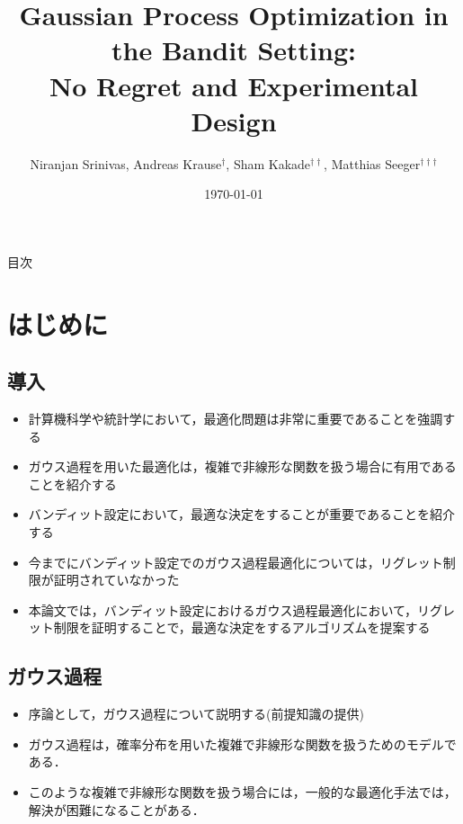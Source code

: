 \documentclass[dvipdfmx, 10.5pt]{beamer}
\title[]{Gaussian Process Optimization in the Bandit Setting:\\No Regret and Experimental Design}
\subtitle{}
\author[]{Niranjan Srinivas, Andreas Krause$^{\dag}$, Sham Kakade$^{\dag\dag}$, Matthias Seeger$^{\dag\dag\dag}$}
\date[\today]{\today}
\institute[]{$\dag$: California Institute of Technology\\
$\dag\dag$: University of Pennsylvania\\
$\dag\dag\dag$: Saarland University}
\begin{document}

\begin{frame}
\maketitle%
\thispagestyle{empty}%
\end{frame}



\begin{frame}[noframenumbering]{目次}
	\tableofcontents[hideallsubsections]
	\thispagestyle{empty} %
\end{frame}

\section{はじめに}

\subsection{導入}

\begin{frame}{\insertsubsection}
	\begin{itemize}
		\item 計算機科学や統計学において，最適化問題は非常に重要であることを強調する
		\item ガウス過程を用いた最適化は，複雑で非線形な関数を扱う場合に有用であることを紹介する
		\item バンディット設定において，最適な決定をすることが重要であることを紹介する
		\item 今までにバンディット設定でのガウス過程最適化については，リグレット制限が証明されていなかった
		\item 本論文では，バンディット設定におけるガウス過程最適化において，リグレット制限を証明することで，最適な決定をするアルゴリズムを提案する
	\end{itemize}

\end{frame}

\subsection{ガウス過程}
\begin{frame}{\insertsubsection}
	\begin{itemize}
		\item 序論として，ガウス過程について説明する(前提知識の提供)
		\item ガウス過程は，確率分布を用いた複雑で非線形な関数を扱うためのモデルである．
		\item このような複雑で非線形な関数を扱う場合には，一般的な最適化手法では，解決が困難になることがある．
	\end{itemize}


\end{frame}
\end{document}
